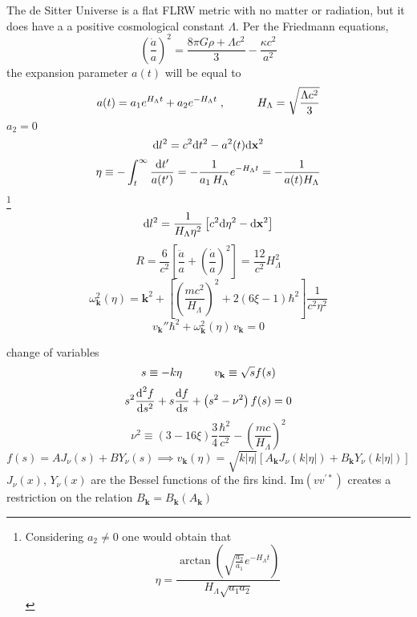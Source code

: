 The de Sitter Universe is a flat FLRW metric with no matter or radiation, but it does have a a positive cosmological constant $\Lambda$. Per the Friedmann equations,
\begin{equation}
	\left(\frac{\dot{a}}{a}\right)^2=\frac{8\pi G\rho+\Lambda c^2}{3}-\frac{\kappa c^2}{a^2}
\end{equation}
the expansion parameter $a(t)$ will be equal to
\begin{equation}
	a(t)=a_1e^{H_\Lambda t}+a_2e^{-H_\Lambda t}\;,\hspace{1.0cm} H_\Lambda=\sqrt{\frac{\Lambda c^2}{3}}
\end{equation}
$a_2=0$
\begin{equation}
	\text{d} l^2=c^2\text{d} t^2-a^2(t)\text{d}\mathbf{x}^2
\end{equation}
\begin{equation}
	\eta\equiv -\int_t^\infty\frac{\text{d} t'}{a(t')}=-\frac{1}{a_1\,H_\Lambda}e^{-H_\Lambda t}=-\frac{1}{a(t)H_\Lambda}
\end{equation}
\footnote{Considering $a_2\not=0$ one would obtain that
$$\eta=\frac{\arctan\left(\sqrt{\frac{a_2}{a_1}}e^{-H_\Lambda t}\right)}{H_\Lambda\sqrt{a_1a_2}}$$}
\begin{equation}
	\text{d} l^2= \frac{1}{H_\Lambda\eta^2}\left[c^2\text{d}\eta^2-\text{d} \mathbf{x}^2\right]
\end{equation}
\begin{equation}
	R=\frac{6}{c^2}\left[\frac{\ddot{a}}{a}+\left(\frac{\dot{a}}{a}\right)^2\right]=\frac{12}{c^2}H_\Lambda^2
\end{equation}
\begin{equation}
	\omega^2_\mathbf{k}(\eta)=\mathbf{k}^2+\left[\left(\frac{mc^2}{H_\Lambda}\right)^2+2\left(6\xi-1\right)\hbar^2\right]\frac{1}{c^2\eta^2}
\end{equation}
\begin{equation}
	v_\mathbf{k}''\hbar^2+\omega^2_\mathbf{k}(\eta)\,v_\mathbf{k}=0
\end{equation}

change of variables
\begin{equation}
	s\equiv -k\eta\hspace{1.0cm}v_\mathbf{k}\equiv \sqrt{s}f(s)
\end{equation}
\begin{equation}
	s^2\frac{\text{d}^2f}{\text{d} s^2}+s\frac{\text{d} f}{\text{d} s}+\left(s^2-\nu^2\right)f(s)=0
\end{equation}
\begin{equation}
	\nu^2\equiv \left(3-16\xi\right)\frac{3}{4}\frac{\hbar^2}{c^2}-\left(\frac{mc}{H_\Lambda}\right)^2
\end{equation}
\begin{equation}
	f(s)=AJ_\nu(s)+BY_\nu(s)\implies v_\mathbf{k}(\eta)=\sqrt{k|\eta|}\left[A_\mathbf{k}J_\nu(k|\eta|)+B_\mathbf{k}Y_\nu(k|\eta|)\right]
\end{equation}
$J_\nu(x),\,Y_\nu(x)$ are the Bessel functions of the firs kind. $\text{Im}(vv^{'*})$ creates a restriction on the relation $B_\mathbf{k}=B_\mathbf{k}(A_\mathbf{k})$